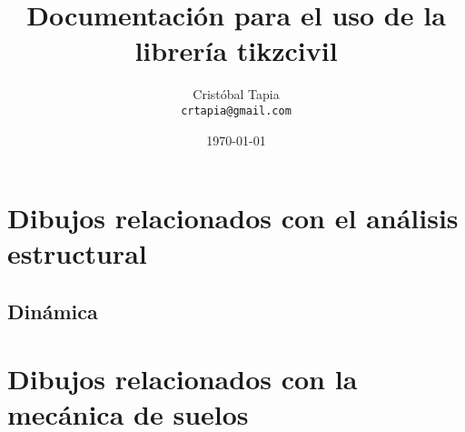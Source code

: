 \documentclass[11pt,letterpaper,oneside]{book}
\begin{document}
\begin{titlepage}
  \title{Documentación para el uso de la librería tikzcivil}
  \author{Cristóbal Tapia\\
    \texttt{crtapia@gmail.com}
  }
  \date{\today}
  \maketitle
\end{titlepage}

\chapter{Dibujos relacionados con el análisis estructural}
\section{Dinámica}


\begin{figure}[!htp]
  \centering
  \qquad
  \label{fig:rigi2}
\end{figure}



\chapter{Dibujos relacionados con la mecánica de suelos}
\end{document}
